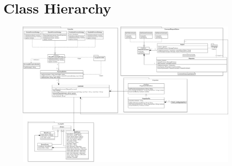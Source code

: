 \section*{Class Hierarchy}{
\thispagestyle{empty}

\begin{figure}[!hbp]
	\centering\includegraphics[width=0.8\linewidth]{images/core/CoreClassDiagram}
\end{figure}

}
